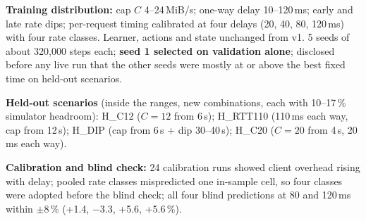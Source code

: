 \textbf{Training distribution:} cap $C$ 4--24\,MiB/s; one-way delay 10--120\,ms; early and late rate dips; per-request timing calibrated at four delays (20, 40, 80, 120\,ms) with four rate classes. Learner, actions and state unchanged from v1. 5 seeds of about 320{,}000 steps each; \textbf{seed 1 selected on validation alone}; disclosed before any live run that the other seeds were mostly at or above the best fixed time on held-out scenarios.

\textbf{Held-out scenarios} (inside the ranges, new combinations, each with 10--17\,\% simulator headroom): H\_C12 ($C=12$ from 6\,s); H\_RTT110 (110\,ms each way, cap from 12\,s); H\_DIP (cap from 6\,s + dip 30--40\,s); H\_C20 ($C=20$ from 4\,s, 20\,ms each way).

\textbf{Calibration and blind check:} 24 calibration runs showed client overhead rising with delay; pooled rate classes mispredicted one in-sample cell, so four classes were adopted before the blind check; all four blind predictions at 80 and 120\,ms within $\pm8$\,\% (+1.4, $-3.3$, +5.6, +5.6\,\%).

